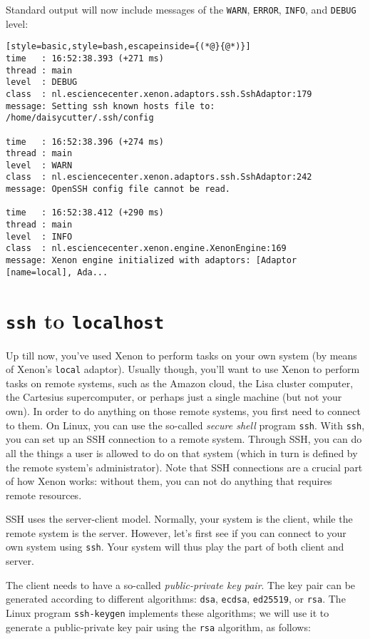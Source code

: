 Standard output will now include messages of the \texttt{WARN}, \texttt{ERROR}, \texttt{INFO}, and \texttt{DEBUG} level:
\begin{lstlisting}[style=basic,style=bash,escapeinside={(*@}{@*)}]
time   : 16:52:38.393 (+271 ms)
thread : main
level  : DEBUG
class  : nl.esciencecenter.xenon.adaptors.ssh.SshAdaptor:179
message: Setting ssh known hosts file to: /home/daisycutter/.ssh/config

time   : 16:52:38.396 (+274 ms)
thread : main
level  : WARN
class  : nl.esciencecenter.xenon.adaptors.ssh.SshAdaptor:242
message: OpenSSH config file cannot be read.

time   : 16:52:38.412 (+290 ms)
thread : main
level  : INFO
class  : nl.esciencecenter.xenon.engine.XenonEngine:169
message: Xenon engine initialized with adaptors: [Adaptor [name=local], Ada...
\end{lstlisting}




\section{\texttt{ssh} to \texttt{localhost}}

Up till now, you've used Xenon to perform tasks on your own system (by means of Xenon's \texttt{local} adaptor). Usually though, you'll want to use Xenon to perform tasks on remote systems, such as the Amazon cloud, the Lisa cluster computer, the Cartesius supercomputer, or perhaps just a single machine (but not your own). In order to do anything on those remote systems, you first need to connect to them. On Linux, you can use the so-called \textit{secure shell} program \texttt{ssh}. With \texttt{ssh}, you can set up an SSH connection to a remote system. Through SSH, you can do all the things a user is allowed to do on that system (which in turn is defined by the remote system's administrator). Note that SSH connections are a crucial part of how Xenon works: without them, you can not do anything that requires remote resources.

SSH uses the server-client model. Normally, your system is the client, while the remote system is the server. However, let's first see if you can connect to your own system using \texttt{ssh}. Your system will thus play the part of both client and server.

The client needs to have a so-called \textit{public-private key pair}. The key pair can be generated according to different algorithms:
\texttt{dsa},
\texttt{ecdsa},
\texttt{ed25519}, or
\texttt{rsa}.
The Linux program \texttt{ssh-keygen} implements these algorithms; we will use it to generate a public-private key pair using the \texttt{rsa} algorithm, as follows:

